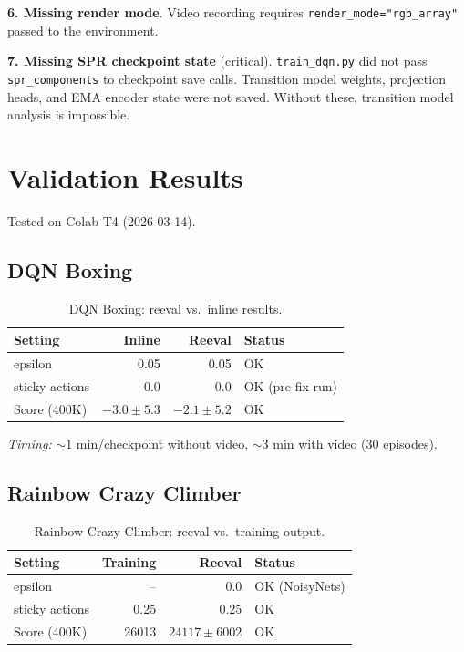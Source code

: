 \documentclass[11pt]{article}
\newcommand{\ok}{\textcolor{green!60!black}{OK}}
\begin{document}
\medskip
\textbf{6. Missing render mode}. Video recording requires
\texttt{render\_mode="rgb\_array"} passed to the environment.

\medskip
\textbf{7. Missing SPR checkpoint state} (critical).
\texttt{train\_dqn.py} did not pass \texttt{spr\_components} to
checkpoint save calls. Transition model weights, projection heads,
and EMA encoder state were not saved. Without these, transition
model analysis is impossible.


\section{Validation Results}

Tested on Colab T4 (2026-03-14).

\subsection{DQN Boxing}

\begin{table}[H]
\centering
\small
\renewcommand{\arraystretch}{1.4}
\begin{tabular}{l r r l}
\toprule
\textbf{Setting} & \textbf{Inline} & \textbf{Reeval}
  & \textbf{Status} \\
\midrule
epsilon        & 0.05           & 0.05
  & \ok \\
sticky actions & 0.0            & 0.0
  & \ok{} (pre-fix run) \\
Score (400K)   & $-3.0 \pm 5.3$ & $-2.1 \pm 5.2$
  & \ok \\
\bottomrule
\end{tabular}
\caption{DQN Boxing: reeval vs.\ inline results.}
\end{table}

\noindent\textit{Timing:} $\sim$1 min/checkpoint without video,
$\sim$3 min with video (30 episodes).

\subsection{Rainbow Crazy Climber}

\begin{table}[H]
\centering
\small
\renewcommand{\arraystretch}{1.4}
\begin{tabular}{l r r l}
\toprule
\textbf{Setting} & \textbf{Training} & \textbf{Reeval}
  & \textbf{Status} \\
\midrule
epsilon        & --     & 0.0
  & \ok{} (NoisyNets) \\
sticky actions & 0.25   & 0.25
  & \ok \\
Score (400K)   & 26013  & $24117 \pm 6002$
  & \ok \\
\bottomrule
\end{tabular}
\caption{Rainbow Crazy Climber: reeval vs.\ training output.}
\end{table}
\end{document}
